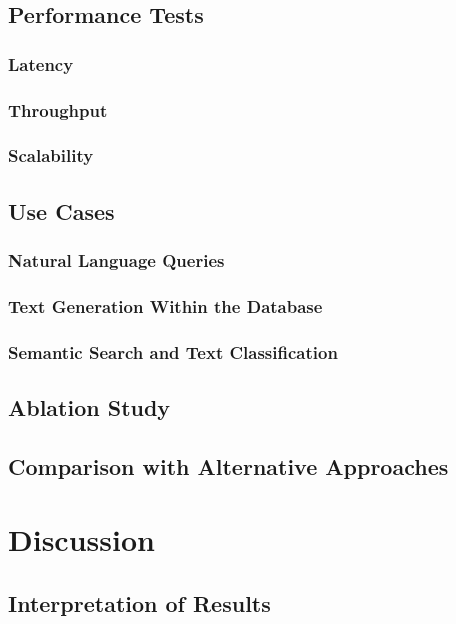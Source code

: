 \documentclass{article}
\begin{document}
\subsection{Performance Tests}
\subsubsection{Latency}
\subsubsection{Throughput}
\subsubsection{Scalability}

\subsection{Use Cases}
\subsubsection{Natural Language Queries}
\subsubsection{Text Generation Within the Database}
\subsubsection{Semantic Search and Text Classification}

\subsection{Ablation Study}

\subsection{Comparison with Alternative Approaches}

\newpage


\section{Discussion}

\subsection{Interpretation of Results}
\end{document}

